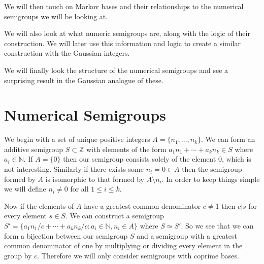 \documentclass[11pt]{amsart}
\theoremstyle{plain}
\theoremstyle{definition}
\begin{document}
We will then touch on Markov bases and their relationships to the numerical
semigroups we will be looking at.

We will also look at what numeric semigroups are, along with the logic of their
construction. We will later use this information and logic to create a similar
construction with the Gaussian integers.

We will finally look the structure of the numerical semigroups and see a
surprising result in the Gaussian analogue of these.

\section{Numerical Semigroups}

We begin with a set of unique positive integers $A=\{n_1,\dots,n_k\}$.
We can form an additive semigroup $S\subset \mathbb{Z}$ with elements of the
form $a_1n_1+\cdots+{a_k}n_k\in S$ where $a_i\in \mathbb{N}$. If $A=\{0\}$ then
our semigroup consists solely of the element $0$, which is not interesting.
Similarly if there exists some $n_i=0\in A$ then the semigroup formed by $A$ is
isomorphic to that formed by $A\setminus n_i$. In order to keep things simple we
will define $n_i\ne 0$ for all $1\le i\le k$.

Now if the elements of $A$ have a greatest common denominator $c\ne 1$ then
$c|s$ for every element $s\in S$. We can construct a semigroup $S'=\{a_1n_1/c+
\cdots+{a_k}{n_k}/c:a_i\in \mathbb{N},n_i\in A\}$ where $S\simeq S'$. So we see
that we can form a bijection between our semigroup $S$ and a semigroup with a
greatest common denominator of one by multiplying or dividing every element in
the group by $c$. Therefore we will only consider semigroups with coprime bases.
\end{document}

